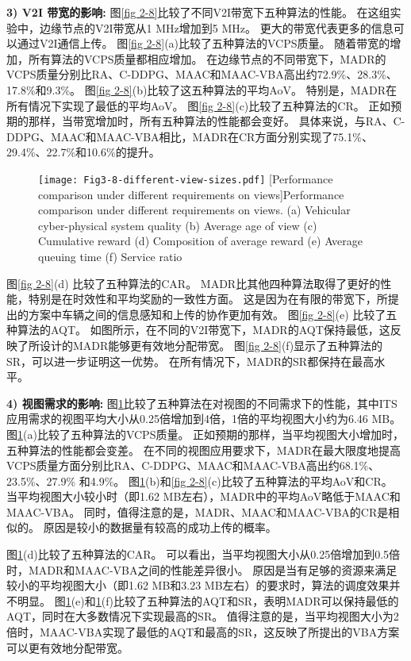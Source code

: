 \textbf{3) V2I 带宽的影响:}
图\ref{fig 2-8}比较了不同V2I带宽下五种算法的性能。
在这组实验中，边缘节点的V2I带宽从1 MHz增加到5 MHz。
更大的带宽代表更多的信息可以通过V2I通信上传。
图\ref{fig 2-8}(a)比较了五种算法的VCPS质量。
随着带宽的增加，所有算法的VCPS质量都相应增加。
在边缘节点的不同带宽下，MADR的VCPS质量分别比RA、C-DDPG、MAAC和MAAC-VBA高出约72.9\%、28.3\%、17.8\%和9.3\%。
图\ref{fig 2-8}(b)比较了这五种算法的平均AoV。
特别是，MADR在所有情况下实现了最低的平均AoV。
图\ref{fig 2-8}(c)比较了五种算法的CR。
正如预期的那样，当带宽增加时，所有五种算法的性能都会变好。
具体来说，与RA、C-DDPG、MAAC和MAAC-VBA相比，MADR在CR方面分别实现了75.1\%、29.4\%、22.7\%和10.6\%的提升。


\begin{figure}[h]
  \centering
  \texttt{[image: Fig3-8-different-view-sizes.pdf]}
  [Performance comparison under different requirements on views]{Performance comparison under different requirements on views. (a) Vehicular cyber-physical system quality (b) Average age of view (c) Cumulative reward (d) Composition of average reward (e) Average queuing time (f) Service ratio}
  \label{fig 2-9}
\end{figure}

图\ref{fig 2-8}(d) 比较了五种算法的CAR。
MADR比其他四种算法取得了更好的性能，特别是在时效性和平均奖励的一致性方面。
这是因为在有限的带宽下，所提出的方案中车辆之间的信息感知和上传的协作更加有效。
图\ref{fig 2-8}(e) 比较了五种算法的AQT。
如图所示，在不同的V2I带宽下，MADR的AQT保持最低，这反映了所设计的MADR能够更有效地分配带宽。
图\ref{fig 2-8}(f)显示了五种算法的SR，可以进一步证明这一优势。
在所有情况下，MADR的SR都保持在最高水平。

\textbf{4) 视图需求的影响:}
图\ref{fig 2-9}比较了五种算法在对视图的不同需求下的性能，其中ITS应用需求的视图平均大小从0.25倍增加到4倍，1倍的平均视图大小约为6.46 MB。
图\ref{fig 2-9}(a)比较了五种算法的VCPS质量。
正如预期的那样，当平均视图大小增加时，五种算法的性能都会变差。
在不同的视图应用要求下，MADR在最大限度地提高VCPS质量方面分别比RA、C-DDPG、MAAC和MAAC-VBA高出约68.1\%、23.5\%、27.9\% 和4.9\%。
图\ref{fig 2-9}(b)和\ref{fig 2-8}(c)比较了五种算法的平均AoV和CR。
当平均视图大小较小时（即1.62 MB左右），MADR中的平均AoV略低于MAAC和MAAC-VBA。
同时，值得注意的是，MADR、MAAC和MAAC-VBA的CR是相似的。
原因是较小的数据量有较高的成功上传的概率。

图\ref{fig 2-9}(d)比较了五种算法的CAR。
可以看出，当平均视图大小从0.25倍增加到0.5倍时，MADR和MAAC-VBA之间的性能差异很小。
原因是当有足够的资源来满足较小的平均视图大小（即1.62 MB和3.23 MB左右）的要求时，算法的调度效果并不明显。
图\ref{fig 2-9}(e)和\ref{fig 2-9}(f)比较了五种算法的AQT和SR，表明MADR可以保持最低的AQT，同时在大多数情况下实现最高的SR。
值得注意的是，当平均视图大小为2倍时，MAAC-VBA实现了最低的AQT和最高的SR，这反映了所提出的VBA方案可以更有效地分配带宽。

